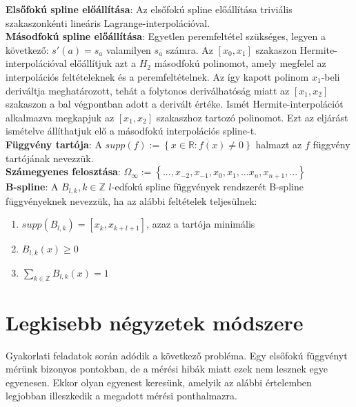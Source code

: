 \documentclass[margin=0px]{article}
\begin{document}
	\noindent \textbf{Elsőfokú spline előállítása}: Az elsőfokú spline előállítása triviális szakaszonkénti
	lineáris Lagrange-interpolációval.\\
	
	\noindent \textbf{Másodfokú spline előállítása}: Egyetlen peremfeltétel szükséges, legyen a következő: $s'(a) = s_{a}$
	valamilyen $s_{a}$ számra. Az $[x_{0},x_{1}]$ szakaszon Hermite-interpolációval előállítjuk azt a $H_{2}$ másodfokú
	polinomot, amely megfelel az interpolációs feltételeknek és a peremfeltételnek. Az így kapott polinom $x_{1}$-beli
	deriváltja meghatározott, tehát a folytonos deriválhatóság miatt az $[x_{1},x_{2}]$ szakaszon a bal végpontban
	adott a derivált értéke. Ismét Hermite-interpolációt alkalmazva megkapjuk az $[x_{1},x_{2}]$ szakaszhoz tartozó
	polinomot. Ezt az eljárást ismételve állíthatjuk elő a másodfokú interpolációs spline-t.\\
	
	\noindent \textbf{Függvény tartója}: A $supp(f) := \overline{\left\{x \in \mathbb{R}: f(x) \not = 0 \right\}}$ halmazt
	az $f$ függvény tartójának nevezzük.\\
	
	\noindent \textbf{Számegyenes felosztása}: $\Omega_{\infty} := \left\{...,x_{-2},x_{-1},x_{0},x_{1},...x_{n},x_{n+1},...\right\}$\\
	
	\noindent \textbf{B-spline}: A $B_{l,k}, k \in \mathbb{Z}$ $l$-edfokú spline függvények rendszerét B-spline függvényeknek
	nevezzük, ha az alábbi feltételek teljesülnek:
	\begin{enumerate}
		\item	$supp(B_{l,k}) = [x_{k},x_{k+l+1}]$, azaz a tartója minimális
		
		\item	$B_{l,k}(x) \geq 0$
		
		\item	$\displaystyle\sum_{k \in \mathbb{Z}}B_{l,k}(x) = 1$
	\end{enumerate}
	
	\section{Legkisebb négyzetek módszere}
	
	Gyakorlati feladatok során adódik a következő probléma. Egy elsőfokú függvényt mérünk bizonyos pontokban, de
	a mérési hibák miatt ezek nem lesznek egye egyenesen. Ekkor olyan egyenest keresünk, amelyik az alábbi
	értelemben legjobban illeszkedik a megadott mérési ponthalmazra.
	
\end{document}
